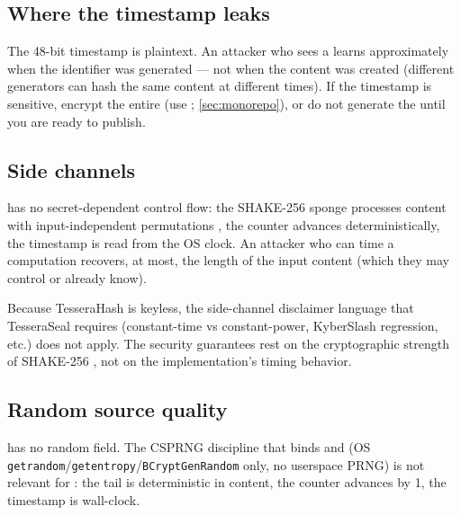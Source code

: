 \subsection{Where the timestamp leaks}

The 48-bit timestamp is plaintext. An attacker who sees a \tesserahash{} learns approximately when the identifier was generated --- not when the content was created (different generators can hash the same content at different times). If the timestamp is sensitive, encrypt the entire \tesserahash{} (use \tesseraseal{}; \cref{sec:monorepo}), or do not generate the \tesserahash{} until you are ready to publish.

\subsection{Side channels}

\tesserahash{} has no secret-dependent control flow: the SHAKE-256 sponge processes content with input-independent permutations \citep{fips202}, the counter advances deterministically, the timestamp is read from the OS clock. An attacker who can time a \tesserahash{} computation recovers, at most, the length of the input content (which they may control or already know).

Because TesseraHash is keyless, the side-channel disclaimer language that TesseraSeal requires (constant-time vs constant-power, KyberSlash regression, etc.) does not apply. The security guarantees rest on the cryptographic strength of SHAKE-256 \citep{fips202}, not on the implementation's timing behavior.

\subsection{Random source quality}

\tesserahash{} has no random field. The CSPRNG discipline that binds \tesseraid{} and \tesseraseal{} (OS \texttt{getrandom}/\texttt{getentropy}/\texttt{BCryptGenRandom} only, no userspace PRNG) is not relevant for \tesserahash{}: the tail is deterministic in content, the counter advances by 1, the timestamp is wall-clock.
